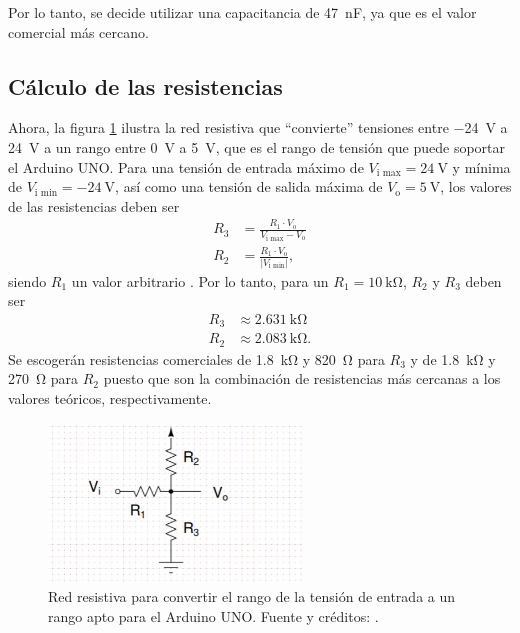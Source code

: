 Por lo tanto, se decide utilizar una capacitancia de \SI{47}{\nano\farad}, ya que es el valor comercial más cercano.
 

 
\subsection{Cálculo de las resistencias}
Ahora, la figura \ref{Fig: cal_resist} ilustra la red resistiva  que ``convierte'' tensiones entre \SI{-24}{\volt} a \SI{24}{\volt} a un rango entre \SI{0}{\volt} a \SI{5}{\volt}, que es el rango de tensión que puede soportar el Arduino UNO. Para una tensión de entrada máximo de $V_\text{i max} = \SI{24}{\volt}$ y mínima de $V_\text{i min} = \SI{-24}{\volt}$, así como una tensión de salida máxima de $V_\text{o} = \SI{5}{\volt}$, los valores de las resistencias deben ser
\begin{align}
    R_3 &= \frac{R_1 \cdot V_\text{o}}{V_\text{i max} - V_\text{o}}\\
    R_2 &= \frac{R_1 \cdot V_\text{o}}{|V_\text{i min}|},
\end{align}
siendo $R_1$ un valor arbitrario \cite{electronics-stackexchange}. Por lo tanto, para un $R_1 = \SI{10}{\kilo\ohm}$, $R_2$ y $R_3$ deben ser
\begin{align*}
    R_3 &\approx \SI{2.631}{\kilo\ohm}\\
    R_2 &\approx \SI{2.083}{\kilo\ohm}.
\end{align*}
Se escogerán resistencias comerciales de \SI{1.8}{\kilo\ohm} y \SI{820}{\ohm} para $R_3$ y de \SI{1.8}{\kilo\ohm} y \SI{270}{\ohm} para $R_2$ puesto que son la combinación de resistencias más cercanas a los valores teóricos, respectivamente.

\begin{figure}[H]
\centering
\includegraphics[width=0.6\textwidth]{Imagenes/Calculos_Resistecias.jpg} 
\caption{Red resistiva para convertir el rango de la tensión de entrada a un rango apto para el Arduino UNO. Fuente y créditos: \cite{electronics-stackexchange}.}
\label{Fig: cal_resist}
\end{figure}

